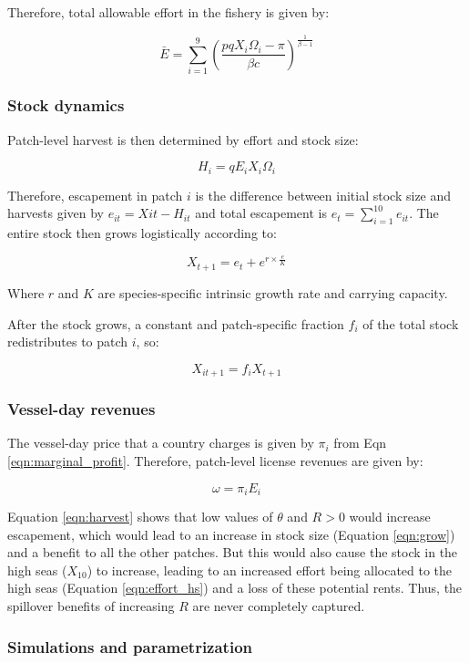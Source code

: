 \documentclass[12pt]{article}
\begin{document}
Therefore, total allowable effort in the fishery is given by:

$$
\bar{E} = \sum_{i = 1}^9\left(\frac{pqX_i\Omega_i - \pi}{\beta c }\right) ^ {\frac{1}{\beta - 1}}
\label{eqn:Ebar}
$$

\subsubsection{Stock dynamics}

Patch-level harvest is then determined by effort and stock size:

$$
H_i = qE_iX_i\Omega_i
\label{eqn:harvest}
$$

Therefore, escapement in patch $i$ is the difference between initial stock size and harvests given by $e_{it} = X{it} - H_{it}$ and total escapement is $e_t=\sum_{i=1}^{10}e_{it}$. The entire stock then grows logistically according to:

$$
X_{t+1} = e_t + e^{r \times \frac{e}{K}}
\label{eqn:grow}
$$

Where $r$ and $K$ are species-specific intrinsic growth rate and carrying capacity.

After the stock grows, a constant and patch-specific fraction $f_i$ of the total stock redistributes to patch $i$, so:

$$
X_{it+1} = f_iX_{t+1}
\label{eqn:disperse}
$$

\subsubsection{Vessel-day revenues}

The vessel-day price that a country charges is given by $\pi_i$ from Eqn \ref{eqn:marginal_profit}. Therefore, patch-level license revenues are given by:

$$
\omega = \pi_iE_i
\label{eqn:license_revenue}
$$

Equation \ref{eqn:harvest} shows that low values of $\theta$ and $R > 0$ would increase escapement, which would lead to an increase in stock size (Equation \ref{eqn:grow}) and a benefit to all the other patches. But this would also cause the stock in the high seas ($X_{10}$) to increase, leading to an increased effort being allocated to the high seas (Equation \ref{eqn:effort_hs}) and a loss of these potential rents. Thus, the spillover benefits of increasing $R$ are never completely captured.

\subsubsection{Simulations and parametrization}
\end{document}
